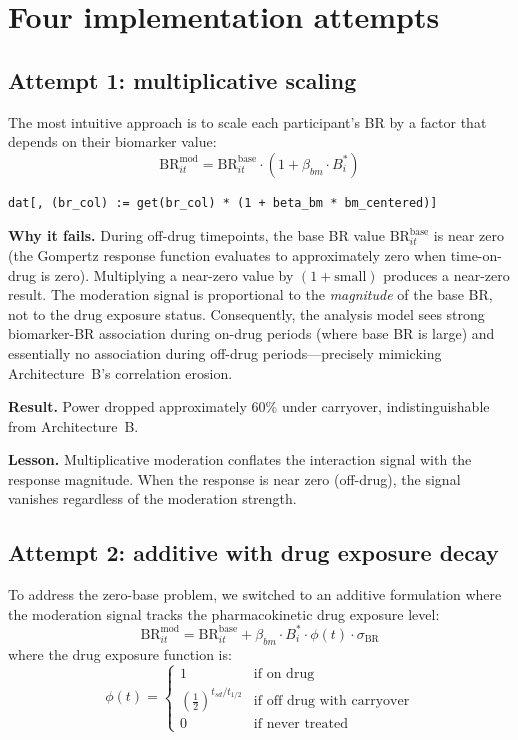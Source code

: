 \documentclass[11pt]{article}
\begin{document}
\section{Four implementation attempts}

\subsection{Attempt 1: multiplicative scaling}

The most intuitive approach is to scale each participant's
BR by a factor that depends on their biomarker value:
%
\begin{equation}
  \text{BR}_{it}^{\text{mod}} = \text{BR}_{it}^{\text{base}}
  \cdot (1 + \beta_{bm} \cdot B_i^{*})
\end{equation}

\begin{lstlisting}
dat[, (br_col) := get(br_col) * (1 + beta_bm * bm_centered)]
\end{lstlisting}

\textbf{Why it fails.} During off-drug timepoints, the base
BR value $\text{BR}_{it}^{\text{base}}$ is near zero (the
Gompertz response function evaluates to approximately zero
when time-on-drug is zero). Multiplying a near-zero value by
$(1 + \text{small})$ produces a near-zero result. The
moderation signal is proportional to the \emph{magnitude} of
the base BR, not to the drug exposure status. Consequently,
the analysis model sees strong biomarker-BR association during
on-drug periods (where base BR is large) and essentially no
association during off-drug periods---precisely mimicking
Architecture~B's correlation erosion.

\textbf{Result.} Power dropped approximately 60\% under
carryover, indistinguishable from Architecture~B.

\textbf{Lesson.} Multiplicative moderation conflates the
interaction signal with the response magnitude. When the
response is near zero (off-drug), the signal vanishes
regardless of the moderation strength.

\subsection{Attempt 2: additive with drug exposure decay}

To address the zero-base problem, we switched to an additive
formulation where the moderation signal tracks the
pharmacokinetic drug exposure level:
%
\begin{equation}
  \text{BR}_{it}^{\text{mod}} = \text{BR}_{it}^{\text{base}}
  + \beta_{bm} \cdot B_i^{*} \cdot \phi(t) \cdot \sigma_{\text{BR}}
\end{equation}
%
where the drug exposure function is:
%
\begin{equation}
  \phi(t) =
  \begin{cases}
    1 & \text{if on drug} \\
    \left(\tfrac{1}{2}\right)^{t_{sd} / t_{1/2}} &
      \text{if off drug with carryover} \\
    0 & \text{if never treated}
  \end{cases}
\end{equation}
\end{document}
